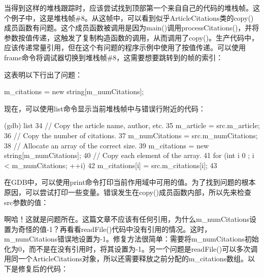 当得到这样的堆栈跟踪时，应该尝试找到顶部第一个来自自己的代码的堆栈帧。这个例子中，这是堆栈帧\#8。从这帧中，可以看到似乎ArticleCitations类的copy()成员函数有问题。这个成员函数被调用是因为main()调用processCitations()，并将参数按值传递，这触发了复制构造函数的调用，从而调用了copy()。生产代码中，应该传递常量引用，但在这个有问题的程序示例中使用了按值传递。可以使用frame命令将调试器切换到堆栈帧\#8，这需要想要跳转到的帧的索引：


这表明以下行出了问题：

\begin{cpp}
m_citations = new string[m_numCitations];
\end{cpp}

现在，可以使用list命令显示当前堆栈帧中与错误行附近的代码：

\begin{shell}
(gdb) list
34      // Copy the article name, author, etc.
35      m_article = src.m_article;
36      // Copy the number of citations.
37      m_numCitations = src.m_numCitations;
38      // Allocate an array of the correct size.
39      m_citations = new string[m_numCitations];
40      // Copy each element of the array.
41      for (int i { 0 }; i < m_numCitations; ++i) {
42          m_citations[i] = src.m_citations[i];
43      }
\end{shell}

在GDB中，可以使用print命令打印当前作用域中可用的值。为了找到问题的根本原因，可以尝试打印一些变量。错误发生在copy()成员函数内部，所以先来检查src参数的值：


啊哈！这就是问题所在。这篇文章不应该有任何引用，为什么m\_numCitations设置为奇怪的值-1？再看看readFile()代码中没有引用的情况。这时，m\_numCitations错误地设置为-1。修复方法很简单：需要将m\_numCitations初始化为0，而不是在没有引用时，将其设置为-1。另一个问题是readFile()可以多次调用同一个ArticleCitations对象，所以还需要释放之前分配的m\_citations数组。以下是修复后的代码：

